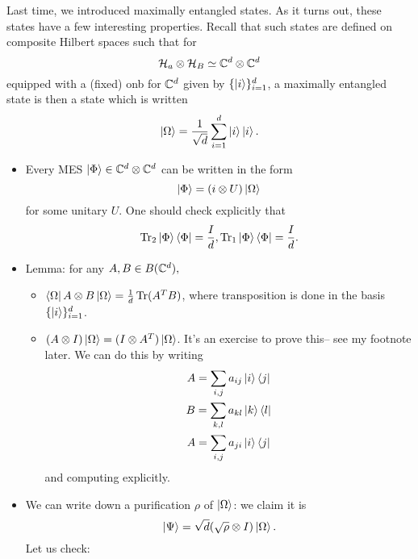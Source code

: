 Last time, we introduced maximally entangled states. As it turns out, these states have a few interesting properties. Recall that such states are defined on composite Hilbert spaces such that for
\begin{equation}
    \mathcal H_a \otimes \mathcal H_B \simeq \mathbb{C}^d \otimes \mathbb{C}^d
\end{equation}
equipped with a (fixed) onb for $\mathbb{C}^d$ given by $\{\left| i \right>\}_{i=1}^d$, a maximally entangled state is then a state which is written
\begin{equation}
    \left| \Omega \right>=\frac{1}{\sqrt{d}} \sum_{i=1}^d \left| i \right>\left| i \right>.
\end{equation}
\begin{itemize}
    \item Every MES $\left| \Phi \right>\in \mathbb{C}^d \otimes \mathbb{C}^d$ can be written in the form
    \begin{equation}
        \left| \Phi \right>=(i\otimes U) \left| \Omega \right>
    \end{equation}
    for some unitary $U$. One should check explicitly that
    \begin{equation}
        \operatorname{Tr}_2 \left| \Phi \right>\left< \Phi \right|=\frac{I}{d},\operatorname{Tr}_1 \left| \Phi \right>\left< \Phi \right|=\frac{I}{d}.
    \end{equation}
    \item Lemma: for any $A,B\in B(\mathbb{C}^d),$
    \begin{itemize}
        \item $\left< \Omega \right|A\otimes B\left| \Omega \right>=\frac{1}{d}\operatorname{Tr}(A^T B)$, where transposition is done in the basis $\{\left| i \right>\}_{i=1}^d$.
        \item $(A\otimes I)\left| \Omega \right>=(I\otimes A^T)\left| \Omega \right>$. It's an exercise to prove this-- see my footnote later.
        We can do this by writing
        \begin{gather*}
            A=\sum_{i,j} a_{ij}\left| i \right>\left< j \right|\\
            B=\sum_{k,l} a_{kl}\left| k \right>\left< l \right|\\
            A=\sum_{i,j} a_{ji}\left| i \right>\left< j \right|
        \end{gather*}
        and computing explicitly.
    \end{itemize}
    \item We can write down a purification $\rho$ of $\left| \Omega \right>$: we claim it is
    \begin{equation}
        \left| \Psi \right>=\sqrt{d}(\sqrt{\rho}\otimes I) \left| \Omega \right>.
    \end{equation}
    Let us check:
    \begin{align*}

\end{align*}
\end{itemize}
